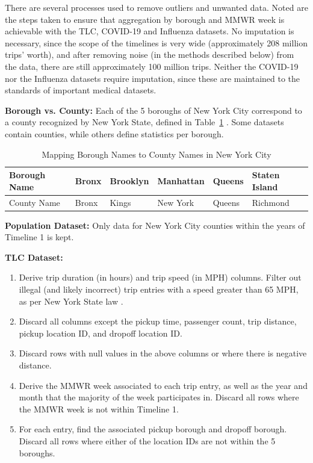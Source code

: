 \documentclass[11pt]{article}
\begin{document}
There are several processes used to remove outliers and unwanted data.
Noted are the steps taken to ensure that aggregation by borough and MMWR week is achievable with the TLC, COVID-19 and Influenza datasets.
No imputation is necessary, since the scope of the timelines is very wide (approximately 208 million trips' worth), 
and after removing noise (in the methods described below) from the data, there are still approximately 100 million trips.
Neither the COVID-19 nor the Influenza datasets require imputation, 
since these are maintained to the standards of important medical datasets.

\textbf{Borough vs. County:} Each of the 5 boroughs of New York City correspond to a county recognized by New York State, defined in Table~\ref{tbl:btc} \cite{countytoborough}.
Some datasets contain counties, while others define statistics per borough.

\begin{table}[H]
        \begin{center}
            \begin{tabular}{|l||l|l|l|l|l|} 
            \hline
            Borough Name    & Bronx & Brooklyn  & Manhattan & Queens    & Staten Island \\
            \hline
            County Name     & Bronx & Kings     & New York  & Queens    & Richmond \\
            \hline
            \end{tabular}
            \caption{Mapping Borough Names to County Names in New York City}
            \label{tbl:btc}
        \end{center}
    \end{table}

\textbf{Population Dataset:}
Only data for New York City counties within the years of Timeline 1 is kept.

\textbf{TLC Dataset:}
\begin{multicols}{2}
    \begin{enumerate}
        \item Derive trip duration (in hours) and trip speed (in MPH) columns. 
        Filter out illegal (and likely incorrect) trip entries with a speed greater than 65 MPH, 
        as per New York State law \cite{laws}.
        \item Discard all columns except the pickup time, passenger count, trip distance, pickup location ID, and dropoff location ID.
        \item Discard rows with null values in the above columns or where there is negative distance.
        \item Derive the MMWR week associated to each trip entry, as well as the year and month that the majority of the week participates in.
        Discard all rows where the MMWR week is not within Timeline 1.
        \item For each entry, find the associated pickup borough and dropoff borough. 
        Discard all rows where either of the location IDs are not within the 5 boroughs.
    \end{enumerate}
\end{multicols}
\end{document}
